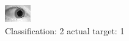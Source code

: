 \begin{figure}[h!]
\begin{center}
\includegraphics[width=0.60\columnwidth]{figures/ID1598_class_2_target_1.png}
\end{center}
\caption{ Classification: 2 actual target: 1}
\label{fig:ID1598_class_2_target_1}
\end{figure}
